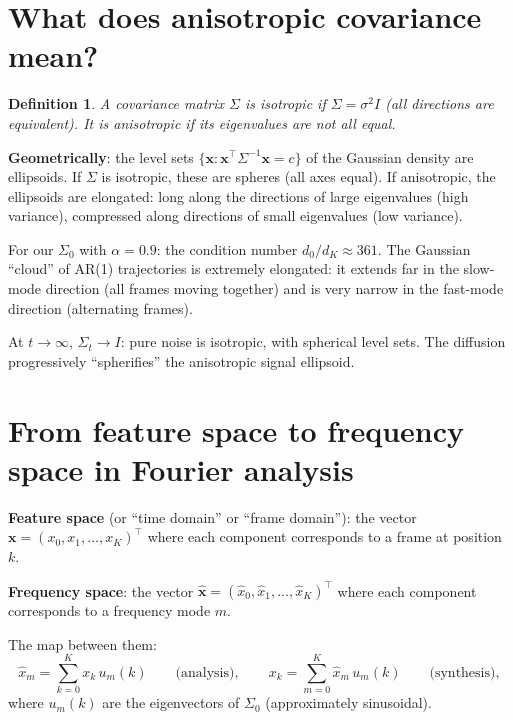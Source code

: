 \documentclass[11pt,a4paper]{article}
\newtheorem{definition}[theorem]{Definition}
\begin{document}
\section{What does anisotropic covariance mean?}
\label{sec:q20}

\begin{definition}
A covariance matrix $\Sigma$ is \emph{isotropic} if $\Sigma = \sigma^2 I$ (all directions are equivalent).  It is \emph{anisotropic} if its eigenvalues are not all equal.
\end{definition}

\textbf{Geometrically}: the level sets $\{\mathbf{x} : \mathbf{x}^\top\Sigma^{-1}\mathbf{x} = c\}$ of the Gaussian density are ellipsoids.  If $\Sigma$ is isotropic, these are spheres (all axes equal).  If anisotropic, the ellipsoids are elongated: long along the directions of large eigenvalues (high variance), compressed along directions of small eigenvalues (low variance).

For our $\Sigma_0$ with $\alpha = 0.9$: the condition number $d_0/d_K \approx 361$.  The Gaussian ``cloud'' of AR(1) trajectories is extremely elongated: it extends far in the slow-mode direction (all frames moving together) and is very narrow in the fast-mode direction (alternating frames).

At $t \to \infty$, $\Sigma_t \to I$: pure noise is isotropic, with spherical level sets.  The diffusion progressively ``spherifies'' the anisotropic signal ellipsoid.


\section{From feature space to frequency space in Fourier analysis}
\label{sec:q21}

\textbf{Feature space} (or ``time domain'' or ``frame domain''): the vector $\mathbf{x} = (x_0, x_1, \dots, x_K)^\top$ where each component corresponds to a frame at position $k$.

\textbf{Frequency space}: the vector $\hat{\mathbf{x}} = (\hat{x}_0, \hat{x}_1, \dots, \hat{x}_K)^\top$ where each component corresponds to a frequency mode $m$.

The map between them:
\begin{equation}
  \hat{x}_m = \sum_{k=0}^{K} x_k\,u_m(k) \qquad \text{(analysis)}, \qquad
  x_k = \sum_{m=0}^{K} \hat{x}_m\,u_m(k) \qquad \text{(synthesis)},
\end{equation}
where $u_m(k)$ are the eigenvectors of $\Sigma_0$ (approximately sinusoidal).
\end{document}
